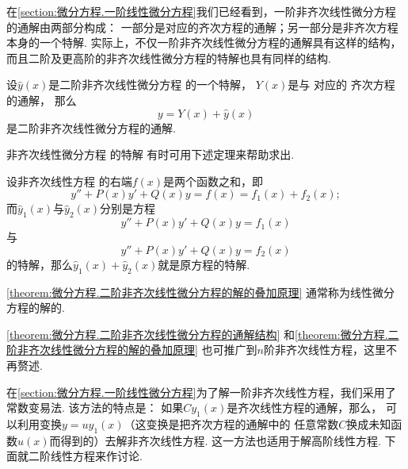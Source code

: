 在\cref{section:微分方程.一阶线性微分方程}我们已经看到，一阶非齐次线性微分方程的通解由两部分构成：
一部分是对应的齐次方程的通解；另一部分是非齐次方程本身的一个特解.
实际上，不仅一阶非齐次线性微分方程的通解具有这样的结构，
而且二阶及更高阶的非齐次线性微分方程的特解也具有同样的结构.
\begin{theorem}\label{theorem:微分方程.二阶非齐次线性微分方程的通解结构}
设\(\hat{y}(x)\)是二阶非齐次线性微分方程  的一个特解，
\(Y(x)\)是与  对应的
齐次方程  的通解，
那么\begin{equation}\label{equation:微分方程.二阶非齐次线性微分方程的通解结构}
	y=Y(x)+\hat{y}(x)
\end{equation}是二阶非齐次线性微分方程的通解.
\end{theorem}

非齐次线性微分方程  的特解
有时可用下述定理来帮助求出.
\begin{theorem}\label{theorem:微分方程.二阶非齐次线性微分方程的解的叠加原理}
设非齐次线性方程 
的右端\(f(x)\)是两个函数之和，即\[
	y''+P(x)y'+Q(x)y
	=f(x)
	=f_1(x)+f_2(x);
\]而\(\hat{y}_1(x)\)与\(\hat{y}_2(x)\)分别是方程\[
	y''+P(x)y'+Q(x)y=f_1(x)
\]与\[
	y''+P(x)y'+Q(x)y=f_2(x)
\]的特解，那么\(\hat{y}_1(x)+\hat{y}_2(x)\)就是原方程的特解.
\end{theorem}

\cref{theorem:微分方程.二阶非齐次线性微分方程的解的叠加原理}
通常称为线性微分方程的解的.

\cref{theorem:微分方程.二阶非齐次线性微分方程的通解结构}
和\cref{theorem:微分方程.二阶非齐次线性微分方程的解的叠加原理}
也可推广到\(n\)阶非齐次线性方程，这里不再赘述.

在\cref{section:微分方程.一阶线性微分方程}为了解一阶非齐次线性方程，我们采用了常数变易法.
该方法的特点是：
如果\(C y_1(x)\)是齐次线性方程的通解，那么，
可以利用变换\(y = u y_1(x)\)（这变换是把齐次方程的通解中的
任意常数\(C\)换成未知函数\(u(x)\)而得到的）去解非齐次线性方程.
这一方法也适用于解高阶线性方程.
下面就二阶线性方程来作讨论.

